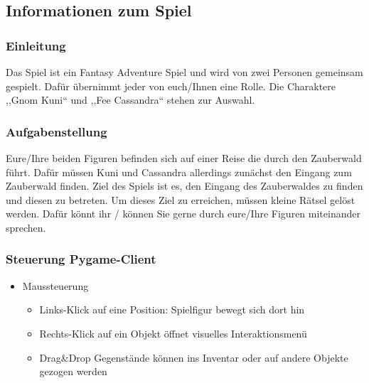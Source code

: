 \subsection*{Informationen zum Spiel}

\subsubsection*{Einleitung}

Das Spiel ist ein Fantasy Adventure Spiel und wird von zwei
Personen gemeinsam gespielt. Dafür übernimmt jeder von euch/Ihnen
eine Rolle. Die Charaktere ,,Gnom Kuni`` und
,,Fee Cassandra`` stehen zur Auswahl.

\noindent\newline
[Rollenverteilung]

\subsubsection*{Aufgabenstellung}

Eure/Ihre beiden Figuren befinden sich auf einer Reise die
durch den Zauberwald führt. Dafür müssen Kuni und Cassandra
allerdings zunächst den Eingang zum Zauberwald finden. Ziel des
Spiels ist es, den Eingang des Zauberwaldes zu finden und diesen
zu betreten. Um dieses Ziel zu erreichen, müssen kleine Rätsel
gelöst werden. Dafür könnt ihr / können Sie
gerne durch eure/Ihre Figuren miteinander sprechen.

\noindent{}

\subsubsection*{Steuerung Pygame-Client}
\begin{itemize}
\item{}Maussteuerung
	\begin{itemize}
	\item{}Links-Klick auf eine Position: Spielfigur bewegt sich dort hin
	\item{}Rechts-Klick auf ein Objekt öffnet visuelles Interaktionsmenü
	\item{}Drag\&Drop Gegenstände können ins Inventar oder auf andere Objekte gezogen werden
	\end{itemize}
\end{itemize}

